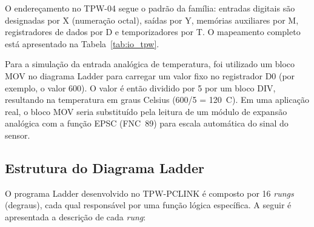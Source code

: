 \documentclass[
  12pt,
  openright,
  oneside,
  a4paper,
  chapter=TITLE,
  section=TITLE,
  brazilian
]{abntex2}
\begin{document}
O endere\c{c}amento no TPW-04 segue o padr\~{a}o da fam\'{i}lia: entradas digitais s\~{a}o designadas por X (numera\c{c}\~{a}o octal), sa\'{i}das por Y, mem\'{o}rias auxiliares por M, registradores de dados por D e temporizadores por T. O mapeamento completo est\'{a} apresentado na Tabela~\ref{tab:io_tpw}.

Para a simula\c{c}\~{a}o da entrada anal\'{o}gica de temperatura, foi utilizado um bloco MOV no diagrama Ladder para carregar um valor fixo no registrador D0 (por exemplo, o valor 600). O valor \'{e} ent\~{a}o dividido por 5 por um bloco DIV, resultando na temperatura em graus Celsius (600/5 = 120~\textdegree{}C). Em uma aplica\c{c}\~{a}o real, o bloco MOV seria substitu\'{i}do pela leitura de um m\'{o}dulo de expans\~{a}o anal\'{o}gica com a fun\c{c}\~{a}o EPSC (FNC~89) para escala autom\'{a}tica do sinal do sensor.

\subsection{Estrutura do Diagrama Ladder}

O programa Ladder desenvolvido no TPW-PCLINK \'{e} composto por 16 \textit{rungs} (degraus), cada qual respons\'{a}vel por uma fun\c{c}\~{a}o l\'{o}gica espec\'{i}fica. A seguir \'{e} apresentada a descri\c{c}\~{a}o de cada \textit{rung}:
\end{document}
